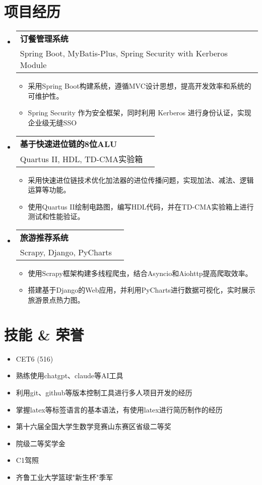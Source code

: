 \documentclass[a4paper,11pt]{ctexart}
\makeatletter
\newenvironment{resumeSubHeadingListStart}{\begin{itemize}[leftmargin=*,label={}]}{\end{itemize}}
\newenvironment{resumeItemListStart}{\begin{itemize}[leftmargin=*,label={}]}{\end{itemize}}
\newcommand{\resumeItem}[1]{
  \item\small{#1}
}
\newcommand{\resumeSubheading}[4]{
  \item
  \begin{tabular*}{0.97\textwidth}[t]{l@{\extracolsep{\fill}}r}
    \textbf{#1} & #2 \\
    #3 & #4 \\
  \end{tabular*}
}
\makeatother
\begin{document}
\section{项目经历}
\begin{resumeSubHeadingListStart}
    \resumeSubheading
      {订餐管理系统}{}
      {Spring Boot, MyBatis-Plus, Spring Security with Kerberos Module}{}
      \begin{resumeItemListStart}
        \resumeItem{采用Spring Boot构建系统，遵循MVC设计思想，提高开发效率和系统的可维护性。}
        \resumeItem{Spring Security 作为安全框架，同时利用 Kerberos 进行身份认证，实现企业级无缝SSO}
      \end{resumeItemListStart}
    \resumeSubheading
      {基于快速进位链的8位ALU}{}
      {Quartus II, HDL, TD-CMA实验箱}{}
      \begin{resumeItemListStart}
        \resumeItem{采用快速进位链技术优化加法器的进位传播问题，实现加法、减法、逻辑运算等功能。}
        \resumeItem{使用Quartus II绘制电路图，编写HDL代码，并在TD-CMA实验箱上进行测试和性能验证。}
      \end{resumeItemListStart}
    \resumeSubheading
      {旅游推荐系统}{}
      {Scrapy, Django,  PyCharts}{}
      \begin{resumeItemListStart}
        \resumeItem{使用Scrapy框架构建多线程爬虫，结合Asyncio和Aiohttp提高爬取效率。}
        \resumeItem{搭建基于Django的Web应用，并利用PyCharts进行数据可视化，实时展示旅游景点热力图。}
      \end{resumeItemListStart}
\end{resumeSubHeadingListStart}

\section{技能 \& 荣誉}
\begin{resumeSubHeadingListStart}
    \begin{resumeItemListStart}
      \resumeItem{CET6 (516)}
      \resumeItem{熟练使用chatgpt、claude等AI工具}
      \resumeItem{利用git、github等版本控制工具进行多人项目开发的经历}
      \resumeItem{掌握latex等标签语言的基本语法，有使用latex进行简历制作的经历}
      \resumeItem{第十六届全国大学生数学竞赛山东赛区省级二等奖}
      \resumeItem{院级二等奖学金}
      \resumeItem{C1驾照}
      \resumeItem{齐鲁工业大学篮球"新生杯"季军}
    \end{resumeItemListStart}
\end{resumeSubHeadingListStart}
\end{document}
